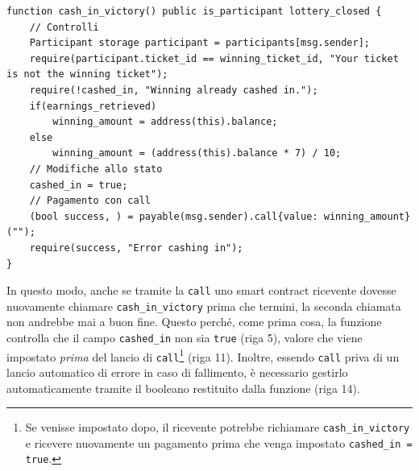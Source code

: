 \documentclass[12pt,a4paper,openright,twoside]{report}
\begin{document}
\begin{lstlisting}[language=Solidity, caption=Corretto utilizzo di \texttt{call}, label={lst:call}]
function cash_in_victory() public is_participant lottery_closed {
    // Controlli
    Participant storage participant = participants[msg.sender];
    require(participant.ticket_id == winning_ticket_id, "Your ticket is not the winning ticket");
    require(!cashed_in, "Winning already cashed in.");
    if(earnings_retrieved)
        winning_amount = address(this).balance;
    else
        winning_amount = (address(this).balance * 7) / 10;  
    // Modifiche allo stato
    cashed_in = true;
    // Pagamento con call
    (bool success, ) = payable(msg.sender).call{value: winning_amount}("");
    require(success, "Error cashing in");
}
\end{lstlisting}
In questo modo, anche se tramite la \texttt{call} uno smart contract ricevente dovesse nuovamente chiamare \texttt{cash\_in\_victory} prima che termini, la seconda chiamata non andrebbe mai a buon fine. Questo perché, come prima cosa, la funzione controlla che il campo \texttt{cashed\_in} non sia \texttt{true} (riga 5), valore che viene impostato \textit{prima} del lancio di \texttt{call}\footnote{Se venisse impostato dopo, il ricevente potrebbe richiamare \texttt{cash\_in\_victory} e ricevere nuovamente un pagamento prima che venga impostato \texttt{cashed\_in = true}.} (riga 11). Inoltre, essendo \texttt{call} priva di un lancio automatico di errore in caso di fallimento, è necessario gestirlo automaticamente tramite il booleano restituito dalla funzione (riga 14).
\end{document}
